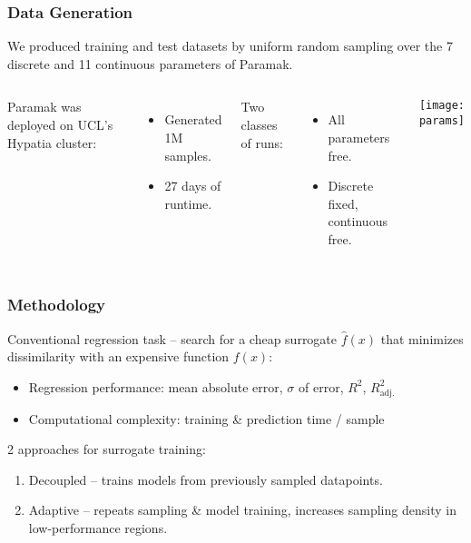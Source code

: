 \begin{frame}
	\frametitle{Data Generation}
	We produced training and test datasets by uniform random sampling over the 7 discrete and 11 continuous parameters of Paramak.\newline
	 \begin{columns}[onlytextwidth,T]
      \column{\dimexpr\linewidth-7cm-5mm}
        
        Paramak was deployed on UCL's Hypatia cluster:
        \begin{itemize}
            \item Generated 1M samples.
            \item 27 days of runtime.
        \end{itemize}
        
        	\vspace{10pt}
        
        Two classes of runs:
        \begin{itemize}
            \item All parameters free.
            \item Discrete fixed, continuous free.
        \end{itemize}
        
      \column{7cm}
      \vspace{-0.5cm}
      \texttt{[image: params]}

    \end{columns}
\end{frame}


\begin{frame}
	\frametitle{Methodology}
		Conventional regression task -- search for a cheap surrogate $\hat{f}(x)$ that
		minimizes dissimilarity with an expensive function $f(x)$:

		\begin{itemize}
			\item
				Regression performance: mean absolute error, $\sigma$ of
				error, $R^2$, $R^2_\text{adj.}$
			\item
				Computational complexity:
				training \& prediction time / sample
		\end{itemize}

		\vspace{2em}

		2 approaches for surrogate training:
		\begin{enumerate}
			\item
				Decoupled -- trains models from previously sampled
				datapoints.
			\item
				Adaptive -- repeats sampling \& model training, increases
				sampling density in low-performance regions.
		\end{enumerate}
\end{frame}

